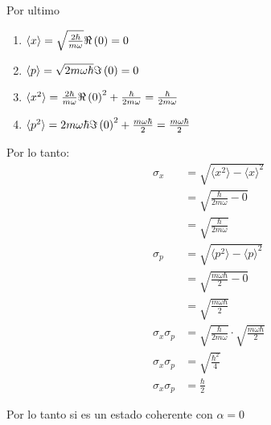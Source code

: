 \documentclass{report}
\newcommand{\inangle}[1]{\langle#1\rangle}
\begin{document}
Por ultimo
\begin{enumerate}
  \item $\langle x \rangle = \sqrt{\frac{2\hbar}{m\omega}} \Re\left(0\right) = 0$
  \item $\langle p \rangle = \sqrt{2 m\omega\hbar}\Im\left(0\right) = 0$
  \item $\langle x^2 \rangle = \frac{2\hbar}{m\omega}\Re \left(0\right)^2 + \frac{\hbar}{2m\omega} = \frac{\hbar}{2m\omega}$
  \item $\langle p^2 \rangle = 2m\omega\hbar\Im\left(0\right)^2 + \frac{m\omega\hbar}{2} = \frac{m\omega\hbar}{2}$
\end{enumerate}

Por lo tanto:
\begin{align*}
  \sigma_x &= \sqrt{\inangle{x^2} - \inangle{x}^2}\\
  &= \sqrt{\frac{\hbar}{2m\omega} - 0}\\
  &= \sqrt{\frac{\hbar}{2m\omega}}\\
  \sigma_p &= \sqrt{\inangle{p^2} - \inangle{p}^2}\\
  &= \sqrt{\frac{m\omega\hbar}{2} - 0}\\
  &= \sqrt{\frac{m\omega\hbar}{2}}\\
  \sigma_x\sigma_p &= \sqrt{\frac{\hbar}{2m\omega}} \cdot \sqrt{\frac{m\omega\hbar}{2}}\\
  \sigma_x\sigma_p &= \sqrt{\frac{\hbar^2}{4}}\\
  \sigma_x\sigma_p &= \frac{\hbar}{2}
\end{align*}

Por lo tanto si es un estado coherente con $\alpha = 0$
\end{document}
